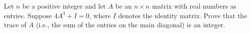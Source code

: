 Let $n$ be a positive integer and let $A$ be an $n \times n$ matrix with real
numbers as entries. Suppose $4A^4 + I = 0$, where $I$ denotes the identity
matrix. Prove that the trace of $A$ (i.e., the sum of the entries on the main
diagonal) is an integer.
